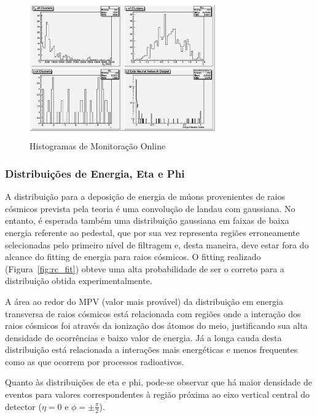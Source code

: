 \documentclass[a4paper,10pt,titlepage]{article}
\begin{document}
\begin{figure}[htbp!]
 \centering
 \includegraphics[width=8cm,height=6cm]{Figs/cosmics/rc_dqm.jpeg}
 \caption{Histogramas de Monitoração Online}
 \label{fig:rc_dqm}
\end{figure}

\subsubsection{Distribuições de Energia, Eta e Phi}

A distribuição para a deposição de energia de múons provenientes de raios cósmicos prevista pela teoria é uma convolução de landau com gaussiana. No entanto, é esperada também uma distribuição gaussiana em faixas de baixa energia referente ao pedestal, que por sua vez representa regiões erroneamente selecionadas pelo primeiro nível de filtragem e, desta maneira, deve estar fora do alcance do fitting de energia para raios cósmicos.
O fitting realizado (Figura~\ref{fig:rc_fit}) obteve uma alta probabilidade de ser o correto para a distribuição obtida experimentalmente.

A área ao redor do MPV (valor mais provável) da distribuição em energia transversa de raios cósmicos está relacionada com regiões onde a interação dos raios cósmicos foi através da ionização dos átomos do meio, justificando sua alta densidade de ocorrências e baixo valor de energia.
Já a longa cauda desta distribuição está relacionada a interações mais energéticas e menos frequentes como as que ocorrem por processos radioativos.

Quanto às distribuições de eta e phi, pode-se observar que há maior densidade de eventos para valores correspondentes à região próxima ao eixo vertical central do detector ($\eta = 0$ e $\phi = \pm \frac{\pi}{2}$).
\end{document}
